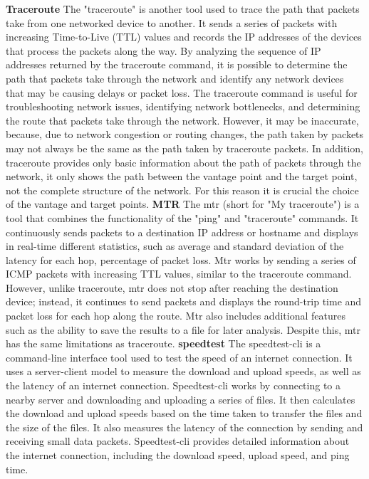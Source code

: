 \documentclass[eng]{class}
\begin{document}
\textbf{Traceroute} \newline
The "traceroute" is another tool used to trace the path that packets take from one networked device to another.
It sends a series of packets with increasing Time-to-Live (TTL) values and records the IP addresses of the devices that process the packets along the way.
By analyzing the sequence of IP addresses returned by the traceroute command,
it is possible to determine the path that packets take through the network and identify any network devices that may be causing delays or packet loss.
The traceroute command is useful for troubleshooting network issues, identifying network bottlenecks, and determining the route that packets take through the network.
However, it may be inaccurate, because, due to network congestion or routing changes,
the path taken by packets may not always be the same as the path taken by traceroute packets.
In addition, traceroute provides only basic information about the path of packets through the network,
it only shows the path between the vantage point and the target point, not the complete structure of the network.
For this reason it is crucial the choice of the vantage and target points.\newline
\newline
\textbf{MTR} \newline
The mtr (short for "My traceroute") is a tool that combines the functionality of the "ping" and "traceroute" commands.
It continuously sends packets to a destination IP address or hostname and displays  in real-time
different statistics, such as average and standard deviation of the latency for each hop, percentage of packet loss.
Mtr works by sending a series of ICMP packets with increasing TTL values, similar to the traceroute command.
However, unlike traceroute, mtr does not stop after reaching the destination device; instead,
it continues to send packets and displays the round-trip time and packet loss for each hop along the route.
Mtr also includes additional features such as the ability to save the results to a file for later analysis.
Despite this, mtr has the same limitations as traceroute.\newline
\newline
\textbf{speedtest} \newline
The speedtest-cli is a command-line interface tool used to test the speed of an internet connection.
It uses a server-client model to measure the download and upload speeds, as well as the latency of an internet connection.
Speedtest-cli works by connecting to a nearby server and downloading and uploading a series of files.
It then calculates the download and upload speeds based on the time taken to transfer the files and the size of the files.
It also measures the latency of the connection by sending and receiving small data packets.
Speedtest-cli provides detailed information about the internet connection, including the download speed, upload speed, and ping time.
\end{document}
